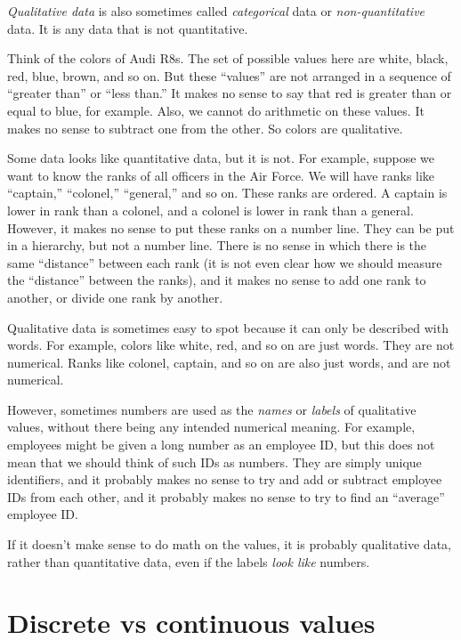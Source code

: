 \documentclass[../../../main.tex]{subfiles}
\begin{document}
\emph{Qualitative data} is also sometimes called \emph{categorical} data or \emph{non-quantitative} data. It is any data that is not quantitative. 
  
Think of the colors of Audi R8s. The set of possible values here are white, black, red, blue, brown, and so on. But these ``values'' are not arranged in a sequence of ``greater than'' or ``less than.'' It makes no sense to say that red is greater than or equal to blue, for example. Also, we cannot do arithmetic on these values. It makes no sense to subtract one from the other. So colors are qualitative.
  
Some data looks like quantitative data, but it is not. For example, suppose we want to know the ranks of all officers in the Air Force. We will have ranks like ``captain,'' ``colonel,'' ``general,'' and so on. These ranks are ordered. A captain is lower in rank than a colonel, and a colonel is lower in rank than a general. However, it makes no sense to put these ranks on a number line. They can be put in a hierarchy, but not a number line. There is no sense in which there is the same ``distance'' between each rank (it is not even clear how we should measure the ``distance'' between the ranks), and it makes no sense to add one rank to another, or divide one rank by another.

Qualitative data is sometimes easy to spot because it can only be described with words. For example, colors like white, red, and so on are just words. They are not numerical. Ranks like colonel, captain, and so on are also just words, and are not numerical. 
  
However, sometimes numbers are used as the \emph{names} or \emph{labels} of qualitative values, without there being any intended numerical meaning. For example, employees might be given a long number as an employee ID, but this does not mean that we should think of such IDs as numbers. They are simply unique identifiers, and it probably makes no sense to try and add or subtract employee IDs from each other, and it probably makes no sense to try to find an ``average'' employee ID. 
  
If it doesn't make sense to do math on the values, it is probably qualitative data, rather than quantitative data, even if the labels \emph{look like} numbers.


\section{Discrete vs continuous values}
\end{document}
